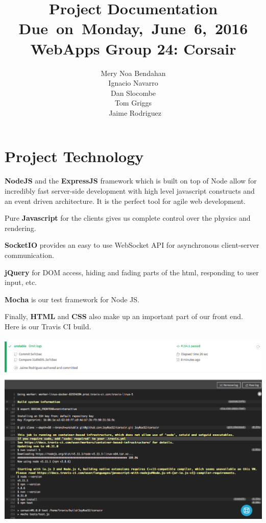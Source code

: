 \documentclass{article}
\title{
\vspace{2in}
\textmd{\textbf{Project Documentation}}\\
\normalsize\vspace{0.1in}\small{Due\ on\ Monday,\ June\ 6,\ 2016}\\
\vspace{0.1in}\large{\textbf{WebApps Group 24: Corsair}}
\vspace{3in}
}
\author{Mery Noa Bendahan \\ Ignacio Navarro \\ Dan Slocombe \\ Tom Griggs \\ Jaime Rodriguez}
\date{}
\renewcommand{\_}{\char`_}
\begin{document}
\section{Project Technology}

\textbf{NodeJS} and the \textbf{ExpressJS} framework which is built on top of 
Node allow for incredibly fast server-side development with 
high level javascript constructs and an event driven architecture.
It is the perfect tool for agile web development.

Pure \textbf{Javascript} for the clients gives us complete control over the 
physics and rendering.

\textbf{SocketIO} provides an easy to use WebSocket API for asynchronous
client-server communication.

\textbf{jQuery} for DOM access, hiding and fading parts of the html, 
responding to user input, etc.

\textbf{Mocha} is our test framework for Node JS.

Finally, \textbf{HTML} and \textbf{CSS} also make up an important part of our front end.\\

Here is our Travis CI build.\\\\
\includegraphics[width=17.5cm]{tech.png}
\end{document}
